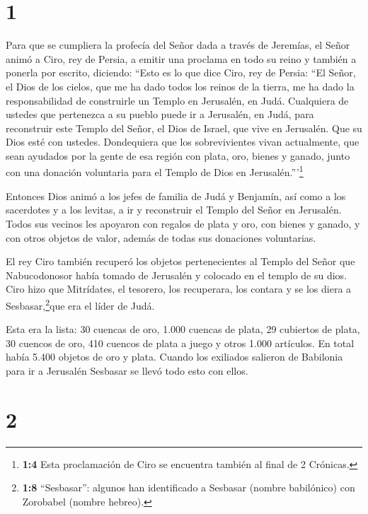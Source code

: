 \hypertarget{section}{%
\section{1}\label{section}}

 Para que se cumpliera la profecía del Señor dada a través
de Jeremías, el Señor animó a Ciro, rey de Persia, a emitir una proclama
en todo su reino y también a ponerla por escrito, diciendo: 
``Esto es lo que dice Ciro, rey de Persia: ``El Señor, el Dios de los
cielos, que me ha dado todos los reinos de la tierra, me ha dado la
responsabilidad de construirle un Templo en Jerusalén, en Judá.
 Cualquiera de ustedes que pertenezca a su pueblo puede ir a
Jerusalén, en Judá, para reconstruir este Templo del Señor, el Dios de
Israel, que vive en Jerusalén. Que su Dios esté con ustedes.
 Dondequiera que los sobrevivientes vivan actualmente, que
sean ayudados por la gente de esa región con plata, oro, bienes y
ganado, junto con una donación voluntaria para el Templo de Dios en
Jerusalén.'''\footnote{\textbf{1:4} Esta proclamación de Ciro se
  encuentra también al final de 2 Crónicas.}

 Entonces Dios animó a los jefes de familia de Judá y
Benjamín, así como a los sacerdotes y a los levitas, a ir y reconstruir
el Templo del Señor en Jerusalén.  Todos sus vecinos les
apoyaron con regalos de plata y oro, con bienes y ganado, y con otros
objetos de valor, además de todas sus donaciones voluntarias.

 El rey Ciro también recuperó los objetos pertenecientes al
Templo del Señor que Nabucodonosor había tomado de Jerusalén y colocado
en el templo de su dios.  Ciro hizo que Mitrídates, el
tesorero, los recuperara, los contara y se los diera a
Sesbasar,\footnote{\textbf{1:8} ``Sesbasar'': algunos han identificado a
  Sesbasar (nombre babilónico) con Zorobabel (nombre hebreo).}que era el
líder de Judá.

 Esta era la lista: 30 cuencas de oro, 1.000 cuencas de
plata, 29 cubiertos de plata,  30 cuencos de oro, 410
cuencos de plata a juego y otros 1.000 artículos.  En total
había 5.400 objetos de oro y plata. Cuando los exiliados salieron de
Babilonia para ir a Jerusalén Sesbasar se llevó todo esto con ellos.

\hypertarget{section-1}{%
\section{2}\label{section-1}}

